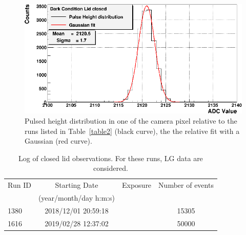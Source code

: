 \begin{figure}[h!!]
\centering
\includegraphics[angle=0, width=12cm]{Figure/PIXEL60_PDM20_LG_DICEMBRE_2018.eps}
\vspace{0.5cm}
\caption{ Pulsed height distribution in one of the camera pixel relative to the runs listed in
Table~\ref{table2} (black curve), the the relative fit with a Gaussian (red curve).}
\label{fig:dark}
\end{figure}
\label{subs:skydata}


\begin{table}[htbp!!]
\centering
\caption{Log of closed lid observations. For these runs, LG data are considered.}
\label{tab:dark}
\begin{tabular}{lccc}
\hline\hline
Run ID & Starting Date & Exposure     & Number of events \\
               & (year/month/day h:m:s)   \\
\hline     
1380 & 2018/12/01 20:59:18  &       & 15305      \\
1616 & 2019/02/28 12:37:02  &      & 50000     \\
\hline\hline
\end{tabular}
\end{table}
